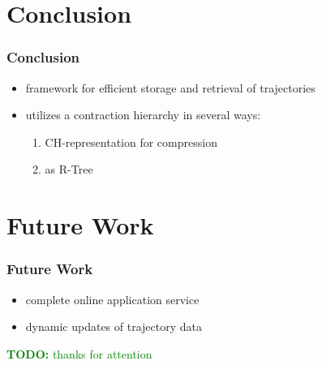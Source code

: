 \documentclass[10pt, t,
aspectratio=1610,%
usenames,
dvipsnames,
]{beamer}
\newcommand{\TODO}[1]{\noindent\textcolor{green}{\textbf{TODO:} #1}}
\newcommand{\chrep}{CH-representation\xspace}
\begin{document}
\section{Conclusion}
\begin{frame}
	\frametitle{Conclusion}
	\begin{itemize}
		\item framework for efficient storage and retrieval of trajectories \pause
		\item utilizes a contraction hierarchy in several ways: \pause
		      \begin{enumerate}
			      \item \chrep for compression \pause
			      \item as R-Tree
		      \end{enumerate}
	\end{itemize}
\end{frame}

\section{Future Work}
\begin{frame}
	\frametitle{Future Work}
	\begin{itemize}
		\item complete online application service \pause
		\item dynamic updates of trajectory data
	\end{itemize}
\end{frame}

\TODO {thanks for attention}

\end{document}

